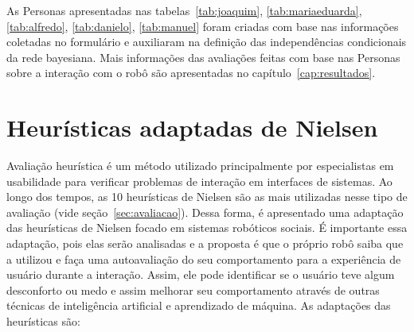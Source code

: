 As Personas apresentadas nas tabelas~\ref{tab:joaquim}, \ref{tab:mariaeduarda}, \ref{tab:alfredo}, \ref{tab:danielo}, \ref{tab:manuel} foram criadas com base nas informações coletadas no formulário e auxiliaram na definição das independências condicionais da rede bayesiana. Mais informações das avaliações feitas com base nas Personas sobre a interação com o robô são apresentadas no capítulo~\ref{cap:resultados}.

\section{Heurísticas adaptadas de Nielsen}
\label{sec:heuristicas}
Avaliação heurística é um método utilizado principalmente por especialistas em usabilidade para verificar problemas de interação em interfaces de sistemas. Ao longo dos tempos, as 10 heurísticas de Nielsen são as mais utilizadas nesse tipo de avaliação (vide seção~\ref{sec:avaliacao}). Dessa forma, é apresentado uma adaptação das heurísticas de Nielsen focado em sistemas robóticos sociais. É importante essa adaptação, pois elas serão analisadas e a proposta é que o próprio robô saiba que a utilizou e faça uma  autoavaliação do seu comportamento para a experiência de usuário durante a interação. Assim, ele pode identificar se o usuário teve algum desconforto ou medo e assim melhorar seu comportamento através de outras técnicas de inteligência artificial e aprendizado de máquina. As adaptações das heurísticas são:

